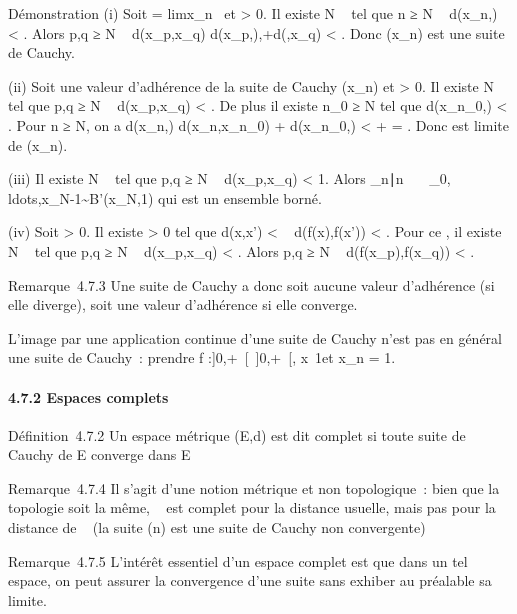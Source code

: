 \documentclass[]{article}
\begin{document}
Démonstration (i) Soit \ell = limx\_n~ et
\epsilon \textgreater{} 0. Il existe N \in {}~ tel que n ≥ N \rigtharrow~ d(x\_n,\ell)
\textless{} \epsilon{}. Alors p,q ≥ N \rigtharrow~ d(x\_p,x\_q) \leq
d(x\_p,\ell),+d(\ell,x\_q) \textless{} \epsilon. Donc (x\_n)
est une suite de Cauchy.

(ii) Soit \ell une valeur d'adhérence de la suite de Cauchy (x\_n)
et \epsilon \textgreater{} 0. Il existe N \in {}~ tel que p,q ≥ N \rigtharrow~
d(x\_p,x\_q) \textless{} \epsilon{}. De plus il existe
n\_0 ≥ N tel que d(x\_n\_0,\ell) \textless{} \epsilon{}.
Pour n ≥ N, on a d(x\_n,\ell) \leq
d(x\_n,x\_n\_0) + d(x\_n\_0,\ell)
\textless{} \epsilon{} + \epsilon{} = \epsilon. Donc \ell est limite de (x\_n).

(iii) Il existe N \in {}~ tel que p,q ≥ N \rigtharrow~ d(x\_p,x\_q)
\textless{} 1. Alors
\x\_n∣n \in
{}~\
\subset~\x\_0,\\ldots,x\_N-1\~
\cup B'(x\_N,1) qui est un ensemble borné.

(iv) Soit \epsilon \textgreater{} 0. Il existe \eta \textgreater{} 0 tel que
d(x,x') \textless{} \eta \rigtharrow~ d(f(x),f(x')) \textless{} \epsilon. Pour ce \eta, il
existe N \in \mathbb{N}~ tel que p,q ≥ N \rigtharrow~ d(x\_p,x\_q) \textless{}
\eta. Alors p,q ≥ N \rigtharrow~ d(f(x\_p),f(x\_q)) \textless{} \epsilon.

Remarque~4.7.3 Une suite de Cauchy a donc soit aucune valeur d'adhérence
(si elle diverge), soit une valeur d'adhérence si elle converge.

L'image par une application continue d'une suite de Cauchy n'est pas en
général une suite de Cauchy~: prendre f :{]}0,+\infty~{[}\rightarrow~{]}0,+\infty~{[},
x\mapsto~1\diagupx et x\_n = 1\diagupn.

\paragraph{4.7.2 Espaces complets}

Définition~4.7.2 Un espace métrique (E,d) est dit complet si toute suite
de Cauchy de E converge dans E

Remarque~4.7.4 Il s'agit d'une notion métrique et non topologique~: bien
que la topologie soit la même, ~ est complet pour la distance usuelle,
mais pas pour la distance de \overline\mathbb{R}~ (la suite (n)
est une suite de Cauchy non convergente)

Remarque~4.7.5 L'intérêt essentiel d'un espace complet est que dans un
tel espace, on peut assurer la convergence d'une suite sans exhiber au
préalable sa limite.
\end{document}
